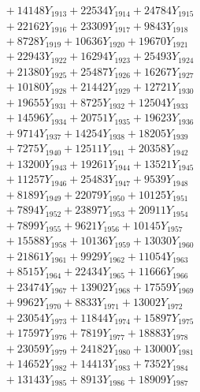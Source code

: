\documentclass[a4paper,10pt]{article}
\begin{document}
{\begin{align}
&\;  + 14148 Y_{1913} + 22534 Y_{1914} + 24784 Y_{1915} \\[0.3ex]
&\;  + 22162 Y_{1916} + 23309 Y_{1917} + 9843 Y_{1918} \\[0.5ex]\allowbreak
&\;  + 8728 Y_{1919} + 10636 Y_{1920} + 19670 Y_{1921} \\[0.3ex]
&\;  + 22943 Y_{1922} + 16294 Y_{1923} + 25493 Y_{1924} \\[0.3ex]
&\;  + 21380 Y_{1925} + 25487 Y_{1926} + 16267 Y_{1927} \\[0.3ex]
&\;  + 10180 Y_{1928} + 21442 Y_{1929} + 12721 Y_{1930} \\[0.3ex]
&\;  + 19655 Y_{1931} + 8725 Y_{1932} + 12504 Y_{1933} \\[0.3ex]
&\;  + 14596 Y_{1934} + 20751 Y_{1935} + 19623 Y_{1936} \\[0.3ex]
&\;  + 9714 Y_{1937} + 14254 Y_{1938} + 18205 Y_{1939} \\[0.3ex]
&\;  + 7275 Y_{1940} + 12511 Y_{1941} + 20358 Y_{1942} \\[0.3ex]
&\;  + 13200 Y_{1943} + 19261 Y_{1944} + 13521 Y_{1945} \\[0.3ex]
&\;  + 11257 Y_{1946} + 25483 Y_{1947} + 9539 Y_{1948} \\[0.5ex]\allowbreak
&\;  + 8189 Y_{1949} + 22079 Y_{1950} + 10125 Y_{1951} \\[0.3ex]
&\;  + 7894 Y_{1952} + 23897 Y_{1953} + 20911 Y_{1954} \\[0.3ex]
&\;  + 7899 Y_{1955} + 9621 Y_{1956} + 10145 Y_{1957} \\[0.3ex]
&\;  + 15588 Y_{1958} + 10136 Y_{1959} + 13030 Y_{1960} \\[0.3ex]
&\;  + 21861 Y_{1961} + 9929 Y_{1962} + 11054 Y_{1963} \\[0.3ex]
&\;  + 8515 Y_{1964} + 22434 Y_{1965} + 11666 Y_{1966} \\[0.3ex]
&\;  + 23474 Y_{1967} + 13902 Y_{1968} + 17559 Y_{1969} \\[0.3ex]
&\;  + 9962 Y_{1970} + 8833 Y_{1971} + 13002 Y_{1972} \\[0.3ex]
&\;  + 23054 Y_{1973} + 11844 Y_{1974} + 15897 Y_{1975} \\[0.3ex]
&\;  + 17597 Y_{1976} + 7819 Y_{1977} + 18883 Y_{1978} \\[0.5ex]\allowbreak
&\;  + 23059 Y_{1979} + 24182 Y_{1980} + 13000 Y_{1981} \\[0.3ex]
&\;  + 14652 Y_{1982} + 14413 Y_{1983} + 7352 Y_{1984} \\[0.3ex]
&\;  + 13143 Y_{1985} + 8913 Y_{1986} + 18909 Y_{1987} \\[0.3ex]

\end{align}}
\end{document}
